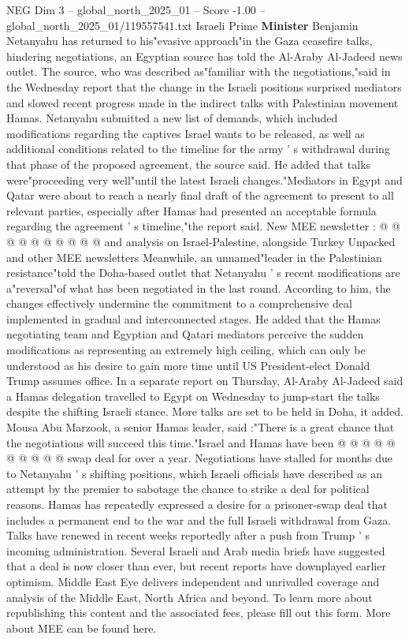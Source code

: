 \begin{textsample}{NEG Dim 3 – global\_north\_2025\_01 – Score -1.00 – global\_north\_2025\_01/119557541.txt}  \label{ex:f3_neg_194}
Israeli Prime \textbf{Minister} Benjamin Netanyahu has returned to his"evasive approach"in the Gaza ceasefire talks, hindering negotiations, an Egyptian source has told the Al-Araby Al-Jadeed news outlet.
The source, who was described as"familiar with the negotiations,"said in the Wednesday report that the change in the Israeli positions surprised mediators and slowed recent progress made in the indirect talks with Palestinian movement Hamas.
Netanyahu submitted a new list of demands, which included modifications regarding the captives Israel wants to be released, as well as additional conditions related to the timeline for the army ' s withdrawal during that phase of the proposed agreement, the source said.
He added that talks were"proceeding very well"until the latest Israeli changes."Mediators in Egypt and Qatar were about to reach a nearly final draft of the agreement to present to all relevant parties, especially after Hamas had presented an acceptable formula regarding the agreement ' s timeline,"the report said.
New MEE newsletter : @ @ @ @ @ @ @ @ @ @ and analysis on Israel-Palestine, alongside Turkey Unpacked and other MEE newsletters Meanwhile, an unnamed"leader in the Palestinian resistance"told the Doha-based outlet that Netanyahu ' s recent modifications are a"reversal"of what has been negotiated in the last round.
According to him, the changes effectively undermine the commitment to a comprehensive deal implemented in gradual and interconnected stages.
He added that the Hamas negotiating team and Egyptian and Qatari mediators perceive the sudden modifications as representing an extremely high ceiling, which can only be understood as his desire to gain more time until US President-elect Donald Trump assumes office.
In a separate report on Thursday, Al-Araby Al-Jadeed said a Hamas delegation travelled to Egypt on Wednesday to jump-start the talks despite the shifting Israeli stance.
More talks are set to be held in Doha, it added.
Mousa Abu Marzook, a senior Hamas leader, said :"There is a great chance that the negotiations will succeed this time."Israel and Hamas have been @ @ @ @ @ @ @ @ @ @ swap deal for over a year.
Negotiations have stalled for months due to Netanyahu ' s shifting positions, which Israeli officials have described as an attempt by the premier to sabotage the chance to strike a deal for political reasons.
Hamas has repeatedly expressed a desire for a prisoner-swap deal that includes a permanent end to the war and the full Israeli withdrawal from Gaza.
Talks have renewed in recent weeks reportedly after a push from Trump ' s incoming administration.
Several Israeli and Arab media briefs have suggested that a deal is now closer than ever, but recent reports have downplayed earlier optimism.
Middle East Eye delivers independent and unrivalled coverage and analysis of the Middle East, North Africa and beyond.
To learn more about republishing this content and the associated fees, please fill out this form.
More about MEE can be found here.

\end{textsample}
